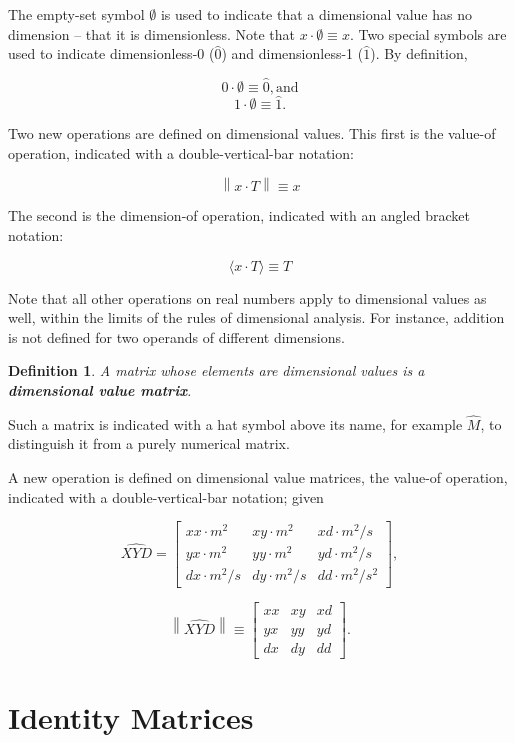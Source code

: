 \documentclass[10pt,letterpaper]{article}
\newtheorem{defn}{Definition}[section]
\numberwithin{equation}{section}
\begin{document}
The empty-set symbol $\emptyset$ is used to indicate that a dimensional value has no dimension – that it is dimensionless.  Note that $x \cdot \emptyset \equiv x$.  Two special symbols are used to indicate dimensionless-0 ($\hat 0$) and dimensionless-1 ($\hat 1$).  By definition,
 
 \[ 0 \cdot \emptyset \equiv \hat 0, \mbox{and} \]
 \[ 1 \cdot \emptyset \equiv \hat 1. \]

Two new operations are defined on dimensional values.  This first is the value-of operation, indicated with a double-vertical-bar notation:

\[ \left\| x \cdot T \right\| \equiv x \]

The second is the dimension-of operation, indicated with an angled bracket notation:

\[ \langle x \cdot T \rangle \equiv T \]

Note that all other operations on real numbers apply to dimensional values as well, within the limits of the rules of dimensional analysis.  For instance, addition is not defined for two operands of different dimensions.


\begin{defn}A matrix whose elements are dimensional values is a \textbf{dimensional value matrix}.\end{defn}
Such a matrix is indicated with a hat symbol above its name, for example $\hat M$, to distinguish it from a purely numerical matrix.

A new operation is defined on dimensional value matrices, the value-of operation, indicated with a double-vertical-bar notation; given

\[ \widehat{XYD} = \left[ \begin{matrix} 
  xx \cdot m^2 & xy \cdot m^2 & xd \cdot m^2/s \\
  yx \cdot m^2 & yy \cdot m^2 & yd \cdot m^2/s \\
  dx \cdot m^2/s & dy \cdot m^2/s & dd \cdot m^2/s^2
 \end{matrix} \right], \]
 
 \[ \left\| \widehat{XYD} \right\| \equiv \left[ \begin{matrix} 
  xx & xy & xd \\
  yx & yy & yd \\
  dx & dy & dd
 \end{matrix} \right]. \]
 
\section{Identity Matrices}
\end{document}
